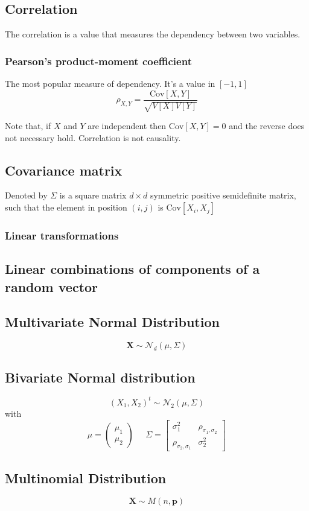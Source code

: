 \subsection{Correlation}
The correlation is a value that measures the dependency between two variables.
\subsubsection{Pearson's product-moment coefficient}
The most popular measure of dependency. It's a value in $[-1,1]$ 
\[ \rho_{X,Y} = \frac{\text{Cov}[X,Y]}{\sqrt{V[X]V[Y]}} \]
\begin{tcolorbox}
    Note that, if $X$ and $Y$ are independent then $\text{Cov}[X,Y]=0$ and the reverse
    does not necessary hold. Correlation is not causality.    
\end{tcolorbox}

\subsection{Covariance matrix}
Denoted by $\Sigma$ is a square matrix $d \times d$ symmetric positive semidefinite matrix,
such that the element in position $(i,j)$ is $\text{Cov}[X_i,X_j]$

\subsubsection{Linear transformations}

\subsection{Linear combinations of components of a random vector}

\subsection{Multivariate Normal Distribution}
\[ \textbf{X} \sim \mathcal{N}_d(\mu,\Sigma)\]

\subsection{Bivariate Normal distribution}
\[ (X_1,X_2)^t \sim \mathcal{N}_2(\mu,\Sigma) \]
with
\[ \mu=\begin{pmatrix}\mu_1\\\mu_2\end{pmatrix}\;\;\;\;\;
    \Sigma=\begin{bmatrix}
        \sigma_1^2 & \rho_{\sigma_1,\sigma_2}\\
        \rho_{\sigma_2,\sigma_1} & \sigma^2_2
    \end{bmatrix}
\]

\subsection{Multinomial Distribution}
\[ \textbf{X} \sim M(n,\textbf{p}) \]
